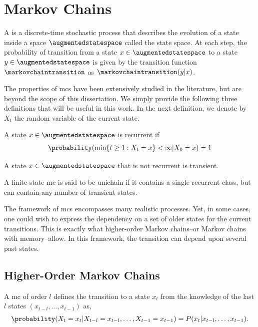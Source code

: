 \section{Markov Chains}
\label{sec:markov_chain}
A  \cite{levin2017markov} is a discrete-time stochastic process that describes the evolution of a state inside a space $\augmentedstatespace$ called the state space.
At each step, the probability of transition from a state $x\in\augmentedstatespace$ to a state $y\in\augmentedstatespace$ is given by the transition function $\markovchaintransition$ as $\markovchaintransition(y\vert x)$.

The properties of \glspl{mc} have been extensively studied in the literature, but are beyond the scope of this dissertation. 
We simply provide the following three definitions that will be useful in this work.
In the next definition, we denote by $X_t$ the random variable of the current state.


\begin{defi}
    A state $x\in\augmentedstatespace$ is recurrent if
    \begin{align*}
        \probability(\min\{t\ge1: X_t=x\}<\infty\vert X_0=x)=1
    \end{align*}
\end{defi}

\begin{defi}
    A state $x\in\augmentedstatespace$  that is not recurrent is transient.
\end{defi}

\begin{defi}
\label{def:unichain_mc}
    A finite-state \gls{mc} is said to be unichain if it contains a single
    recurrent class, but can contain any number of transient states.
\end{defi}

The framework of \glspl{mc} encompasses many realistic processes. 
Yet, in some cases, one could wish to express the dependency on a set of older states for the current transitions. 
This is exactly what higher-order Markov chains--or Markov chains with memory--allow. 
In this framework, the transition can depend upon several past states.

\subsection{Higher-Order Markov Chains}
A \gls{mc} of order $l$ defines the transition to a state $x_t$ from the knowledge of the last $l$ states $(x_{t-l},\dots,x_{t-1})$ as,
\begin{align*}
    \probability(X_t = x_t\vert X_{t-l}=x_{t-l},\dots,X_{t-1}=x_{t-1})=P(x_t\vert x_{t-l},\dots,x_{t-1}).
\end{align*}

